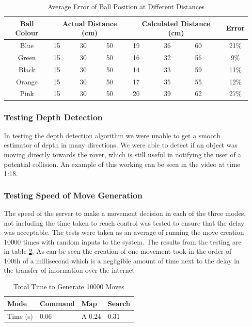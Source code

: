 \documentclass[10pt,twoside]{article}
\begin{document}
\begin{table}[hbt]
\centering
\begin{tabular}{ |c||p{1cm}|p{1cm}|p{1cm}||p{1cm}|p{1cm}|p{1cm}||c|  }
 \hline
 Ball Colour & \multicolumn{3}{|c||}{Actual Distance (cm)} &  \multicolumn{3}{|c||}{Calculated Distance (cm)} & Error\\
 \hline
 Blue & 15 &30 &50 & 19 & 36 & 60 & 21\% \\
 Green & 15 & 30 & 50 & 16 & 32 & 56 & 9\% \\
 Black & 15 & 30 & 50 & 14 & 33 & 59 & 11\% \\
 Orange & 15 & 30 & 50 & 17 & 35 & 55 & 12\% \\
 Pink & 15 & 30 & 50 & 20 & 39 & 62 & 27\% \\
 \hline
\end{tabular}
\caption{\label{tab:BallDistanceTest} Average Error of Ball Position at Different Distances}
\end{table}
\subsubsection{Testing Depth Detection}
In testing the depth detection algorithm we were unable to get a smooth estimator of depth in many directions. We were able to detect if an object was moving directly towards the rover, which is still useful in notifying the user of a potential collision. An example of this working can be seen in the video at time 1:18. 

\subsubsection{Testing Speed of Move Generation}
The speed of the server to make a movement decision in each of the three modes, not including the time taken to reach control was tested to ensure that the delay was acceptable. The tests were taken as an average of running the move creation 10000 times with random inputs to the system. The results from the testing are in table \ref{tab:MoveGeneration}. As can be seen the creation of one movement took in the order of 100th of a millisecond which is a negligible amount of time next to the delay in the transfer of information over the internet
\begin{table}[hbt]
\centering
\begin{tabular}{ |p{3cm}||p{3cm}|p{3cm}|p{3cm}|  }
\hline
 Mode & Command & Map & Search\\
 \hline
 Time (s)  & 0.06    &A 0.24 &   0.31\\
 \hline
\end{tabular}
\caption{\label{tab:MoveGeneration} Total Time to Generate 10000 Moves}
\end{table}
\end{document}
